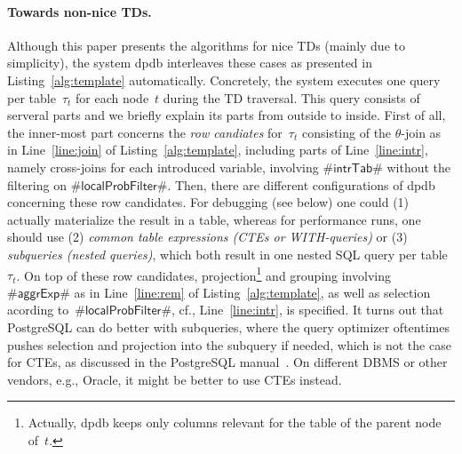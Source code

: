 \documentclass{llncs}
\newcommand{\dpdb}{{\small\textsf{dpdb}}\xspace}
\newcommand{\tab}[1]{\ensuremath{\tau_{#1}}}
\begin{document}
\paragraph*{Towards non-nice TDs.}
Although this paper presents the algorithms for nice TDs (mainly due to simplicity),
the system \dpdb interleaves these cases as presented in 
Listing~\ref{alg:template} automatically.
Concretely, the system executes one query per table~$\tab{t}$ for each node~$t$ during the TD traversal. 
This query consists of serveral parts and we briefly explain its parts from outside to inside. 
First of all, the inner-most part concerns the \emph{row candiates} for~$\tab{t}$ consisting of the $\theta$-join as in Line~\ref{line:join} of Listing~\ref{alg:template}, including parts of Line~\ref{line:intr}, namely cross-joins for each introduced variable, involving $\#\mathsf{intrTab}\#$ without the filtering on $\#\mathsf{localProbFilter}\#$.
Then, there are different configurations of \dpdb concerning these row candidates.
For debugging (see below) one could (1) actually materialize the result in a table,
whereas for performance runs, one should use (2) \emph{common table expressions (CTEs or {\ttfamily WITH}-queries)} or (3) \emph{subqueries (nested queries)}, which both result in one nested SQL query per table~$\tab{t}$. 
On top of these row candidates, projection\footnote{Actually, \dpdb keeps only columns relevant for the table of the parent node of~$t$.} and grouping involving~$\#\mathsf{aggrExp}\#$ as in Line~\ref{line:rem} of Listing~\ref{alg:template}, as well as selection acording to~$\#\mathsf{localProbFilter}\#$, cf., Line~\ref{line:intr}, is specified.
It turns out that PostgreSQL can do better with subqueries, where the query optimizer
oftentimes pushes selection and projection into the subquery if needed, which
is not the case for CTEs, as discussed in the PostgreSQL manual~\cite[Sec. 7.8.1]{postgres}. On different DBMS or other vendors, e.g., Oracle, it might be better to use CTEs instead.
\end{document}

